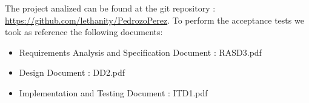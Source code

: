 The project analized can be found at the git repository : \href{https://github.com/lethanity/PedrozoPerez}{https://github.com/lethanity/PedrozoPerez}.
To perform the acceptance tests we took as reference the following documents:
\begin{itemize}
\item Requirements Analysis and Specification Document : RASD3.pdf
\item Design Document : DD2.pdf
\item Implementation and Testing Document : ITD1.pdf
\end{itemize}









